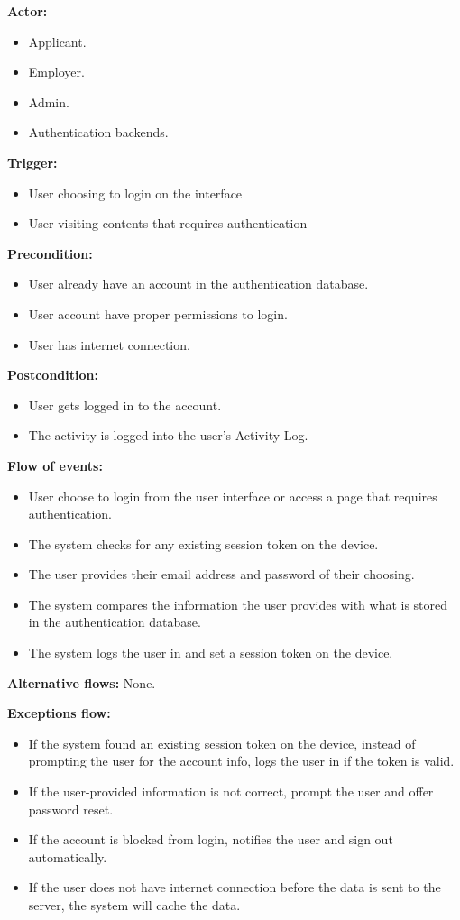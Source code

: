 \documentclass[a4paper]{article}
\begin{document}
\textbf{Actor:}
\begin{itemize}
  \item Applicant.
  \item Employer.
  \item Admin.
  \item Authentication backends.
\end{itemize}

\textbf{Trigger:}
\begin{itemize}
  \item User choosing to login on the interface
  \item User visiting contents that requires authentication
\end{itemize}

\textbf{Precondition:}
\begin{itemize}
  \item User already have an account in the authentication database.
  \item User account have proper permissions to login.
  \item User has internet connection.
\end{itemize}

\textbf{Postcondition:}
\begin{itemize}
  \item User gets logged in to the account.
  \item The activity is logged into the user's Activity Log.
\end{itemize}

\textbf{Flow of events:}
\begin{itemize}
  \item User choose to login from the user interface or access a page that requires authentication.
  \item The system checks for any existing session token on the device.
  \item The user provides their email address and password of their choosing.
  \item The system compares the information the user provides with what is stored in the authentication database.
  \item The system logs the user in and set a session token on the device.
\end{itemize}

\textbf{Alternative flows:}
None.

\textbf{Exceptions flow:}
\begin{itemize}
  \item If the system found an existing session token on the device, instead of prompting the user for the account info, logs the user in if the token is valid.
  \item If the user-provided information is not correct, prompt the user and offer password reset.
  \item If the account is blocked from login, notifies the user and sign out automatically.
  \item If the user does not have internet connection before the data is sent to the server, the system will cache the data.
\end{itemize}
\end{document}
